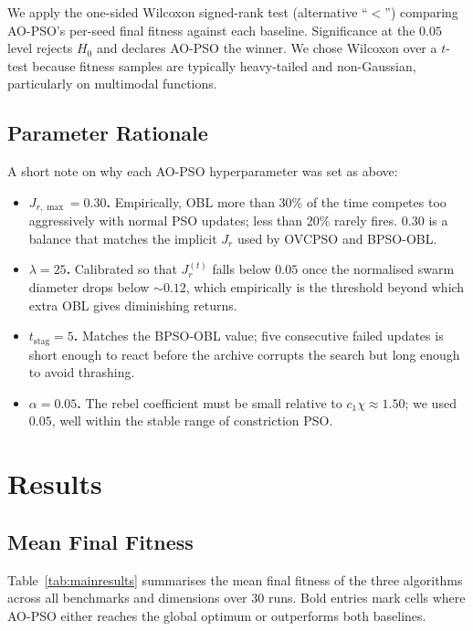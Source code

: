 \documentclass[11pt,a4paper]{article}
\newcommand{\algoname}{AO-PSO}
\newcommand{\jrt}{J_{r}^{(t)}}
\newcommand{\jrmax}{J_{r,\max}}
\begin{document}
We apply the one-sided Wilcoxon signed-rank test (alternative ``$<$'')
comparing \algoname's per-seed final fitness against each baseline.
Significance at the $0.05$ level rejects $H_0$ and declares \algoname{} the
winner. We chose Wilcoxon over a $t$-test because fitness samples are
typically heavy-tailed and non-Gaussian, particularly on multimodal
functions.

\subsection{Parameter Rationale}

A short note on why each AO-PSO hyperparameter was set as above:
\begin{itemize}
  \item \textbf{$\jrmax = 0.30$.} Empirically, OBL more than 30\% of the
        time competes too aggressively with normal PSO updates; less than
        20\% rarely fires. $0.30$ is a balance that matches the implicit
        $J_r$ used by OVCPSO and BPSO-OBL.
  \item \textbf{$\lambda = 25$.} Calibrated so that $\jrt$ falls below
        $0.05$ once the normalised swarm diameter drops below $\sim 0.12$,
        which empirically is the threshold beyond which extra OBL gives
        diminishing returns.
  \item \textbf{$t_{\text{stag}} = 5$.} Matches the BPSO-OBL value; five
        consecutive failed updates is short enough to react before the
        archive corrupts the search but long enough to avoid thrashing.
  \item \textbf{$\alpha = 0.05$.} The rebel coefficient must be small
        relative to $c_1 \chi \approx 1.50$; we used $0.05$, well within
        the stable range of constriction PSO.
\end{itemize}


\section{Results}

\subsection{Mean Final Fitness}

Table~\ref{tab:mainresults} summarises the mean final fitness of the three
algorithms across all benchmarks and dimensions over $30$ runs. Bold
entries mark cells where \algoname{} either reaches the global optimum or
outperforms both baselines.
\end{document}
